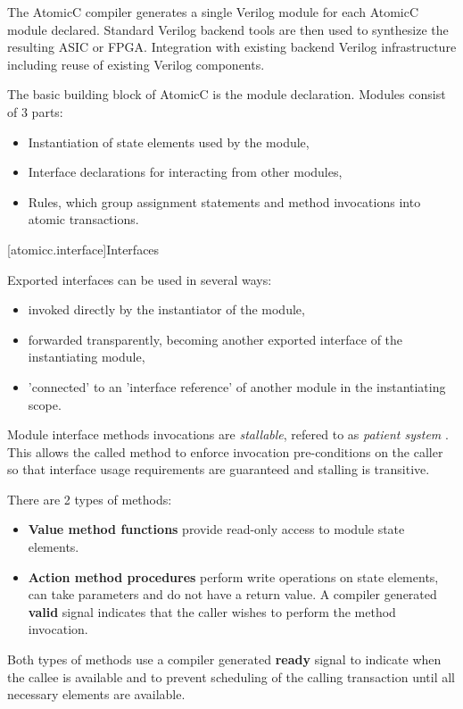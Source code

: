 The AtomicC compiler 
generates a single Verilog module for each AtomicC module declared.
Standard Verilog backend tools are then used to synthesize
the resulting ASIC or FPGA.
Integration with existing backend Verilog infrastructure including reuse of existing Verilog
components.

The basic building block of AtomicC is the module declaration.
Modules consist of 3 parts:
\begin{itemize}
\item Instantiation of state elements used by the module,
\item Interface declarations for interacting from other modules,
\item Rules, which group assignment statements and method invocations into atomic transactions.
\end{itemize}

[atomicc.interface]{Interfaces}

Exported interfaces can be used in several ways:
\begin{itemize}
\item invoked directly by the instantiator of the module,
\item forwarded transparently, becoming another exported interface of the instantiating module,
\item 'connected' to an 'interface reference' of another module in the instantiating scope.
\end{itemize}

Module interface methods invocations are \textit{stallable}, refered to as \textit{patient system}
\cite{carloni2001theory}.
This allows the called method to enforce invocation pre-conditions on the caller
so that interface usage requirements are guaranteed and stalling is transitive.

There are 2 types of methods:
\begin{itemize}
\item \textbf{Value method functions} provide read-only access to module state elements.
\item \textbf{Action method procedures} perform write operations on state elements,
can take parameters and do not have a return value.
A compiler generated
\textbf{valid} signal indicates that the caller wishes to perform the method invocation.
\end{itemize}

Both types of methods use a compiler generated \textbf{ready} signal
to indicate when the callee is available and
to prevent scheduling of the calling transaction until all necessary elements are
available.

